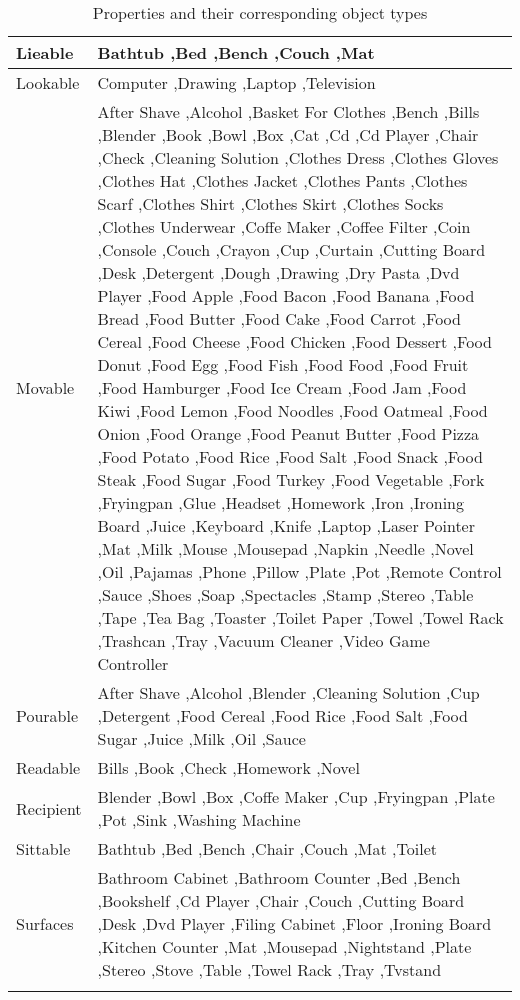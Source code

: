 \begin{longtable}{|p{}|p{}|}
\hline
Lieable & Bathtub  ,Bed  ,Bench  ,Couch  ,Mat  \\
\hline
Lookable & Computer  ,Drawing  ,Laptop  ,Television  \\
\hline
Movable & After Shave  ,Alcohol  ,Basket For Clothes  ,Bench  ,Bills  ,Blender  ,Book  ,Bowl  ,Box  ,Cat  ,Cd  ,Cd Player  ,Chair  ,Check  ,Cleaning Solution  ,Clothes Dress  ,Clothes Gloves  ,Clothes Hat  ,Clothes Jacket  ,Clothes Pants  ,Clothes Scarf  ,Clothes Shirt  ,Clothes Skirt  ,Clothes Socks  ,Clothes Underwear  ,Coffe Maker  ,Coffee Filter  ,Coin  ,Console  ,Couch  ,Crayon  ,Cup  ,Curtain  ,Cutting Board  ,Desk  ,Detergent  ,Dough  ,Drawing  ,Dry Pasta  ,Dvd Player  ,Food Apple  ,Food Bacon  ,Food Banana  ,Food Bread  ,Food Butter  ,Food Cake  ,Food Carrot  ,Food Cereal  ,Food Cheese  ,Food Chicken  ,Food Dessert  ,Food Donut  ,Food Egg  ,Food Fish  ,Food Food  ,Food Fruit  ,Food Hamburger  ,Food Ice Cream  ,Food Jam  ,Food Kiwi  ,Food Lemon  ,Food Noodles  ,Food Oatmeal  ,Food Onion  ,Food Orange  ,Food Peanut Butter  ,Food Pizza  ,Food Potato  ,Food Rice  ,Food Salt  ,Food Snack  ,Food Steak  ,Food Sugar  ,Food Turkey  ,Food Vegetable  ,Fork  ,Fryingpan  ,Glue  ,Headset  ,Homework  ,Iron  ,Ironing Board  ,Juice  ,Keyboard  ,Knife  ,Laptop  ,Laser Pointer  ,Mat  ,Milk  ,Mouse  ,Mousepad  ,Napkin  ,Needle  ,Novel  ,Oil  ,Pajamas  ,Phone  ,Pillow  ,Plate  ,Pot  ,Remote Control  ,Sauce  ,Shoes  ,Soap  ,Spectacles  ,Stamp  ,Stereo  ,Table  ,Tape  ,Tea Bag  ,Toaster  ,Toilet Paper  ,Towel  ,Towel Rack  ,Trashcan  ,Tray  ,Vacuum Cleaner  ,Video Game Controller  \\
\hline
Pourable & After Shave  ,Alcohol  ,Blender  ,Cleaning Solution  ,Cup  ,Detergent  ,Food Cereal  ,Food Rice  ,Food Salt  ,Food Sugar  ,Juice  ,Milk  ,Oil  ,Sauce  \\
\hline
Readable & Bills  ,Book  ,Check  ,Homework  ,Novel  \\
\hline
Recipient & Blender  ,Bowl  ,Box  ,Coffe Maker  ,Cup  ,Fryingpan  ,Plate  ,Pot  ,Sink  ,Washing Machine  \\
\hline
Sittable & Bathtub  ,Bed  ,Bench  ,Chair  ,Couch  ,Mat  ,Toilet  \\
\hline
Surfaces & Bathroom Cabinet  ,Bathroom Counter  ,Bed  ,Bench  ,Bookshelf  ,Cd Player  ,Chair  ,Couch  ,Cutting Board  ,Desk  ,Dvd Player  ,Filing Cabinet  ,Floor  ,Ironing Board  ,Kitchen Counter  ,Mat  ,Mousepad  ,Nightstand  ,Plate  ,Stereo  ,Stove  ,Table  ,Towel Rack  ,Tray  ,Tvstand  \\
\hline
\caption{Properties and their corresponding object types}
\label{tab:properties}
\end{longtable}